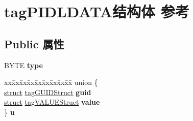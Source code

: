 \hypertarget{structtag_p_i_d_l_d_a_t_a}{}\section{tag\+P\+I\+D\+L\+D\+A\+T\+A结构体 参考}
\label{structtag_p_i_d_l_d_a_t_a}
\subsection*{Public 属性}
\begin{DoxyCompactItemize}
\item 
\mbox{\label{structtag_p_i_d_l_d_a_t_a_a82e1646fcf2e1ee11f43fa40efa8cc45}} 
B\+Y\+TE {\bfseries type}
\item 
\mbox{\label{structtag_p_i_d_l_d_a_t_a_a1219e9b26fec2482b9d374d9f274bd52}} 
\begin{tabbing}
xx\=xx\=xx\=xx\=xx\=xx\=xx\=xx\=xx\=\kill
union \{\\
\>\hyperlink{interfacestruct}{struct} \hyperlink{structtag_g_u_i_d_struct}{tagGUIDStruct} {\bfseries guid}\\
\>\hyperlink{interfacestruct}{struct} \hyperlink{structtag_v_a_l_u_e_struct}{tagVALUEStruct} {\bfseries value}\\
\} {\bfseries u}\\


\end{tabbing}
\end{DoxyCompactItemize}
